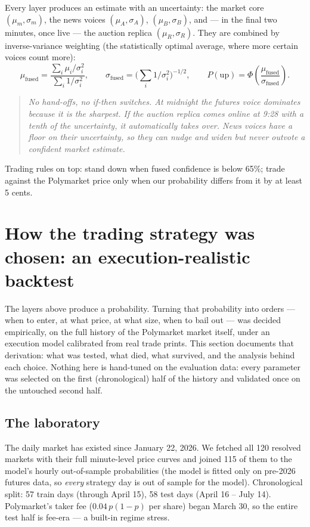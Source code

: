 \documentclass[11pt,a4paper]{article}
\newcommand{\intuition}[1]{\begin{quote}\small\itshape #1\end{quote}}
\begin{document}
Every layer produces an estimate with an uncertainty: the market core
$(\mu_m, \sigma_m)$, the news voices $(\mu_A, \sigma_A)$, $(\mu_B, \sigma_B)$,
and --- in the final two minutes, once live --- the auction replica
$(\mu_R, \sigma_R)$. They are combined by inverse-variance weighting (the
statistically optimal average, where more certain voices count more):
\[
\mu_{\text{fused}} = \frac{\sum_i \mu_i/\sigma_i^2}{\sum_i 1/\sigma_i^2},
\qquad
\sigma_{\text{fused}} = \Big(\sum_i 1/\sigma_i^2\Big)^{-1/2},
\qquad
P(\text{up}) = \Phi\!\left(\frac{\mu_{\text{fused}}}{\sigma_{\text{fused}}}\right).
\]

\intuition{No hand-offs, no if-then switches. At midnight the futures voice
dominates because it is the sharpest. If the auction replica comes online at
9:28 with a tenth of the uncertainty, it automatically takes over. News voices
have a floor on their uncertainty, so they can nudge and widen but never
outvote a confident market estimate.}

Trading rules on top: stand down when fused confidence is below 65\%; trade
against the Polymarket price only when our probability differs from it by at
least 5 cents.

\section{How the trading strategy was chosen: an execution-realistic backtest}

The layers above produce a probability. Turning that probability into orders
--- when to enter, at what price, at what size, when to bail out --- was
decided empirically, on the full history of the Polymarket market itself,
under an execution model calibrated from real trade prints. This section
documents that derivation: what was tested, what died, what survived, and the
analysis behind each choice. Nothing here is hand-tuned on the evaluation
data: every parameter was selected on the first (chronological) half of the
history and validated once on the untouched second half.

\subsection{The laboratory}

The daily market has existed since January 22, 2026. We fetched all 120
resolved markets with their full minute-level price curves and joined 115 of
them to the model's hourly out-of-sample probabilities (the model is fitted
only on pre-2026 futures data, so \emph{every} strategy day is out of
sample for the model). Chronological split: 57 train days (through April 15),
58 test days (April 16 -- July 14). Polymarket's taker fee
($0.04\,p(1-p)$ per share) began March 30, so the entire test half is
fee-era --- a built-in regime stress.
\end{document}
